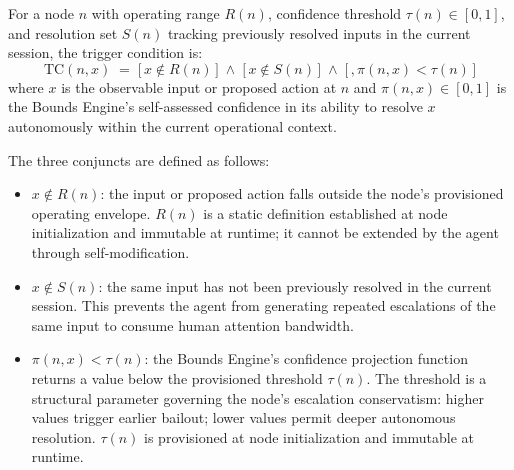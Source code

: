 \begin{definition}
\label{def:tc}
For a node $n$ with operating range $R(n)$, confidence threshold $\tau(n) \in [0, 1]$, and resolution set $S(n)$ tracking previously resolved inputs in the current session, the trigger condition is:
\begin{equation}
\text{TC}(n, x)
\;=\;
\bigl[\,x \notin R(n)\,\bigr]
\;\land\;
\bigl[\,x \notin S(n)\,\bigr]
\;\land\;
\bigl[\,,\pi(n, x) < \tau(n)\,\bigr]
\tag{TC}
\end{equation}
where $x$ is the observable input or proposed action at $n$ and $\pi(n, x) \in [0, 1]$ is the Bounds Engine's self-assessed confidence in its ability to resolve $x$ autonomously within the current operational context.

The three conjuncts are defined as follows:

\begin{itemize}\itemsep=0pt
\item[\textbf{Bound violation}] $x \notin R(n)$: the input or proposed action falls outside the node's provisioned operating envelope. $R(n)$ is a static definition established at node initialization and immutable at runtime; it cannot be extended by the agent through self-modification.

\item[\textbf{Non-redundancy}] $x \notin S(n)$: the same input has not been previously resolved in the current session. This prevents the agent from generating repeated escalations of the same input to consume human attention bandwidth.

\item[\textbf{Confidence deficit}] $\pi(n, x) < \tau(n)$: the Bounds Engine's confidence projection function returns a value below the provisioned threshold $\tau(n)$. The threshold is a structural parameter governing the node's escalation conservatism: higher values trigger earlier bailout; lower values permit deeper autonomous resolution. $\tau(n)$ is provisioned at node initialization and immutable at runtime.
\end{itemize}
\end{definition}

